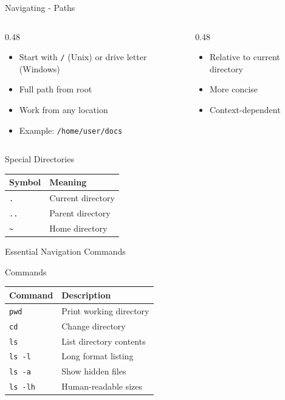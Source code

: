 \documentclass[presentation,aspectratio=1610]{beamer}
\begin{document}
\begin{frame}[label={sec:org9128ee8},fragile]{Navigating - Paths}
 \begin{columns}
\begin{column}{0.48\columnwidth}
\begin{exampleblock}{}\label{sec:org9f7b308}
\begin{itemize}
\item Start with \texttt{/} (Unix) or drive letter (Windows)
\item Full path from root
\item Work from any location
\item \alert{Example:} \texttt{/home/user/docs}
\end{itemize}
\end{exampleblock}
\end{column}
\begin{column}{0.48\columnwidth}
\begin{exampleblock}{}\label{sec:org5f4ef1f}
\begin{itemize}
\item Relative to current directory
\item More concise
\item Context-dependent
\end{itemize}
\end{exampleblock}
\end{column}
\end{columns}
\begin{alertblock}{Special Directories}
\begin{center}
\begin{tabular}{ll}
Symbol & Meaning\\
\hline
\texttt{.} & Current directory\\
\texttt{..} & Parent directory\\
\texttt{\textasciitilde{}} & Home directory\\
\end{tabular}
\end{center}
\end{alertblock}
\end{frame}
\begin{frame}[label={sec:org325561b},fragile]{Essential Navigation Commands}
 \begin{block}{Commands}
\begin{center}
\begin{tabular}{ll}
Command & Description\\
\hline
\texttt{pwd} & Print working directory\\
\texttt{cd} & Change directory\\
\texttt{ls} & List directory contents\\
\texttt{ls -l} & Long format listing\\
\texttt{ls -a} & Show hidden files\\
\texttt{ls -lh} & Human-readable sizes\\
\end{tabular}
\end{center}
\end{block}
\end{frame}
\end{document}
